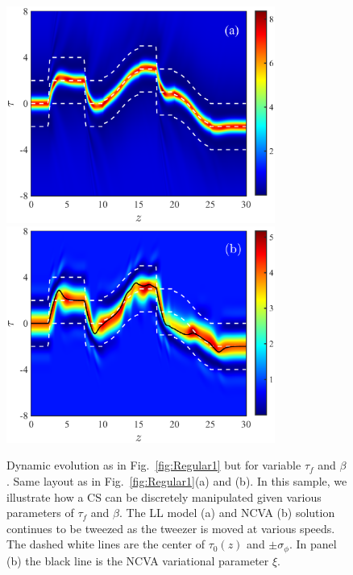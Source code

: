 \documentclass[aps,floatfix,showpacs,preprintnumbers,twocolumn,nofootinbib]{revtex4}
\begin{document}
\begin{figure}[htb!]
\centering
\includegraphics[width=8.8cm]{regularDensityFinal.eps} 
\includegraphics[width=8.8cm]{regularNCVADensityFinal.eps} 
\vspace{-0.5em}
\caption[Dynamic Evolution of Tweezed CS]{Dynamic evolution as in Fig.~\ref{fig:Regular1} but for variable $\tau_f$ and $\beta$.  Same layout as in Fig.~\ref{fig:Regular1}(a) and (b).  In this sample, we illustrate how a CS can be discretely manipulated given various parameters of $\tau_f$ and $\beta$.  The LL model (a) and NCVA (b) solution continues to be tweezed as the tweezer is moved at various speeds.  The dashed white lines are the center of $\tau_0(z)$ and $\pm \sigma_\phi$.  In panel (b) the black line is the NCVA variational parameter $\xi$.
}
\label{fig:Final}
\end{figure}

\end{document}
